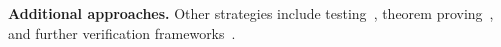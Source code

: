 \medskip
\noindent
\textbf{Additional approaches.}
Other strategies include testing~\cite{WiGo93,PrGr12,PrGr13,EmEn17,Lo17}, theorem proving~\cite{CoDoGr05,DeScWe11}, and further verification frameworks~\cite{BoEmEnMu17,FeEnMoRiSh18,EnKo24}.





